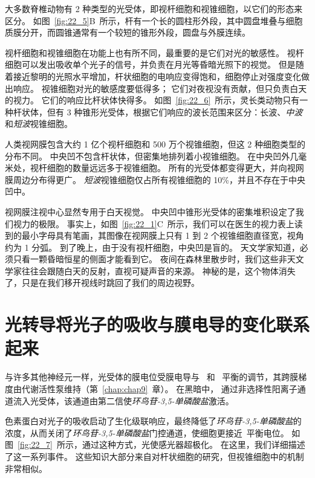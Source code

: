 大多数脊椎动物有 2 种类型的光受体，即视杆细胞和视锥细胞，以它们的形态来区分。
如图~\ref{fig:22_5}B~所示，杆有一个长的圆柱形外段，其中圆盘堆叠与细胞质膜分开，而圆锥通常有一个较短的锥形外段，圆盘与外膜连续。


视杆细胞和视锥细胞在功能上也有所不同，最重要的是它们对光的敏感性。
视杆细胞可以发出吸收单个光子的信号，并负责在月光等昏暗光照下的视觉。
但是随着接近黎明的光照水平增加，杆状细胞的电响应变得饱和，细胞停止对强度变化做出响应。 
视锥细胞对光的敏感度要低得多；
它们对夜视没有贡献，但只负责白天的视力。
它们的响应比杆状体快得多。
如图~\ref{fig:22_6}~所示，灵长类动物只有一种杆状体，但有 3 种锥形光受体，根据它们响应的波长范围来区分：长波、\textit{中波}和\textit{短波}视锥细胞。


人类视网膜包含大约 1 亿个视杆细胞和 500 万个视锥细胞，但这 2 种细胞类型的分布不同。
中央凹不包含杆状体，但密集地排列着小视锥细胞。
在中央凹外几毫米处，视杆细胞的数量远远多于视锥细胞。
所有的光受体都变得更大，并向视网膜周边分布得更广。
\textit{短波}视锥细胞仅占所有视锥细胞的 10\%，并且不存在于中央凹中。


视网膜注视中心显然专用于白天视觉。
中央凹中锥形光受体的密集堆积设定了我们视力的极限。
事实上，如图~\ref{fig:22_1}C~所示，我们可以在医生的视力表上读到的最小字母具有笔画，其图像在视网膜上只有 1 到 2 个视锥细胞直径宽，视角约为 1 分弧。
到了晚上，由于没有视杆细胞，中央凹是盲的。
天文学家知道，必须只看一颗昏暗恒星的侧面才能看到它。
夜间在森林里散步时，我们这些非天文学家往往会跟随白天的反射，直视可疑声音的来源。 
神秘的是，这个物体消失了，只是在我们移开视线时跳回了我们的周边视野。



\section{光转导将光子的吸收与膜电导的变化联系起来}

与许多其他神经元一样，光受体的膜电位受膜电导与~ 和~ 平衡的调节，其跨膜梯度由代谢活性泵维持（第~\ref{chap:chap9}~章）。
在黑暗中， 通过非选择性阳离子通道流入光受体，该通道由第二信使\textit{环鸟苷-3,5-单磷酸盐}激活。


色素蛋白对光子的吸收启动了生化级联响应，最终降低了\textit{环鸟苷-3,5-单磷酸盐}的浓度，从而关闭了\textit{环鸟苷-3,5-单磷酸盐}门控通道，使细胞更接近~平衡电位。
如图~\ref{fig:22_7}~所示，通过这种方式，光使感光器超极化。
在这里，我们详细描述了这一系列事件。
这些知识大部分来自对杆状细胞的研究，但视锥细胞中的机制非常相似。


